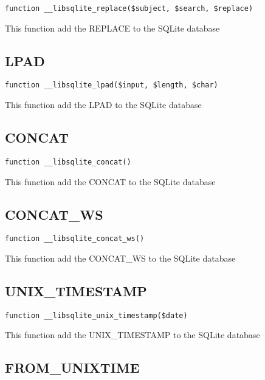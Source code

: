 \documentclass[a4paper]{book}
\begin{document}
\begin{lstlisting}
function __libsqlite_replace($subject, $search, $replace)
\end{lstlisting}

This function add the REPLACE to the SQLite database

\hypertarget{toc310}{}
\subsection{LPAD}

\begin{lstlisting}
function __libsqlite_lpad($input, $length, $char)
\end{lstlisting}

This function add the LPAD to the SQLite database

\hypertarget{toc311}{}
\subsection{CONCAT}

\begin{lstlisting}
function __libsqlite_concat()
\end{lstlisting}

This function add the CONCAT to the SQLite database

\hypertarget{toc312}{}
\subsection{CONCAT\_WS}

\begin{lstlisting}
function __libsqlite_concat_ws()
\end{lstlisting}

This function add the CONCAT\_WS to the SQLite database

\hypertarget{toc313}{}
\subsection{UNIX\_TIMESTAMP}

\begin{lstlisting}
function __libsqlite_unix_timestamp($date)
\end{lstlisting}

This function add the UNIX\_TIMESTAMP to the SQLite database

\hypertarget{toc314}{}
\subsection{FROM\_UNIXTIME}
\end{document}
